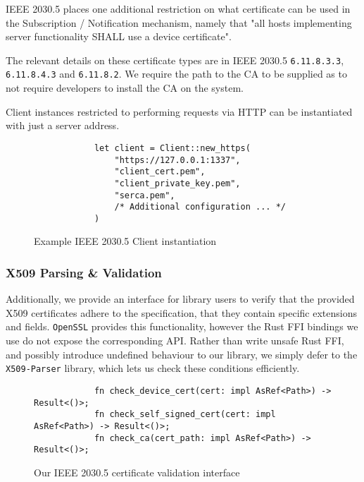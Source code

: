 IEEE 2030.5 places one additional restriction on what certificate can be used in the Subscription / Notification mechanism, namely that "all hosts implementing server functionality SHALL use a device certificate".

The relevant details on these certificate types are in IEEE 2030.5 \texttt{6.11.8.3.3}, \texttt{6.11.8.4.3} and \texttt{6.11.8.2}. We require the path to the CA to be supplied as to not require developers to install the CA on the system.

Client instances restricted to performing requests via HTTP can be instantiated with just a server address.

\begin{figure}[h]
    \begin{center}
        \begin{lstlisting}
            let client = Client::new_https(
                "https://127.0.0.1:1337",
                "client_cert.pem",
                "client_private_key.pem",
                "serca.pem",
                /* Additional configuration ... */
            )
        \end{lstlisting}
        \label{fig:httpsclientexample}
        \vspace{-10pt}
        \caption{Example IEEE 2030.5 Client instantiation}
    \end{center}
\end{figure}

\subsubsection{X509 Parsing \& Validation}
Additionally, we provide an interface for library users to verify that the provided X509 certificates adhere to the specification, that they contain specific extensions and fields. \texttt{OpenSSL} provides this functionality, however the Rust FFI bindings we use do not expose the corresponding API. Rather than write unsafe Rust FFI, and possibly introduce undefined behaviour to our library, we simply defer to the \texttt{X509-Parser} library, which lets us check these conditions efficiently. \cite{x509parser}

\begin{figure}[h]
    \begin{center}
        \begin{lstlisting}
            fn check_device_cert(cert: impl AsRef<Path>) -> Result<()>;
            fn check_self_signed_cert(cert: impl AsRef<Path>) -> Result<()>;
            fn check_ca(cert_path: impl AsRef<Path>) -> Result<()>;
        \end{lstlisting}
        \label{fig:certvalidinterface}
        \vspace{-10pt}
        \caption{Our IEEE 2030.5 certificate validation interface}
    \end{center}
\end{figure}

